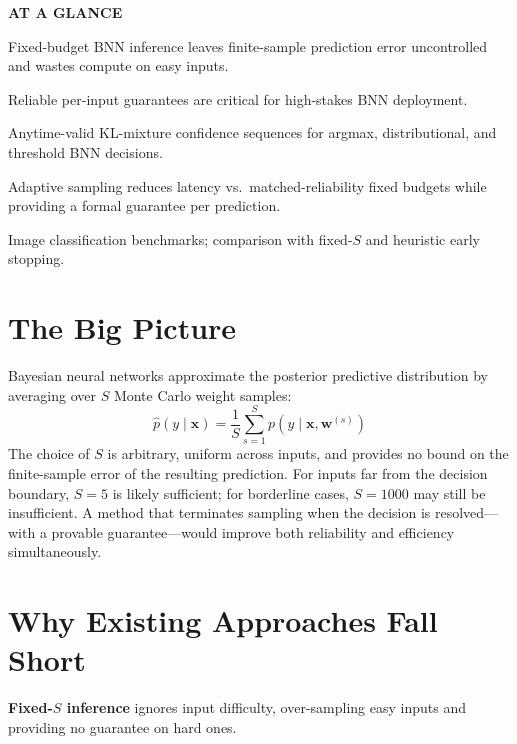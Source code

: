 \documentclass[10pt,twocolumn]{article}
\begin{document}
\begin{mdframed}[backgroundcolor=boxgray,linecolor=rulered,linewidth=1pt,
    innerleftmargin=6pt,innerrightmargin=6pt,
    innertopmargin=6pt,innerbottommargin=6pt]
\textbf{\small AT A GLANCE}\par\vspace{4pt}
\begin{description}[leftmargin=0pt,labelsep=4pt,itemsep=2pt,parsep=0pt,
    font=\small\bfseries]
  \item[Problem:] Fixed-budget BNN inference leaves finite-sample
    prediction error uncontrolled and wastes compute on easy inputs.
  \item[Why it matters:] Reliable per-input guarantees are critical
    for high-stakes BNN deployment.
  \item[Method:] Anytime-valid KL-mixture confidence sequences
    for argmax, distributional, and threshold BNN decisions.
  \item[Result:] Adaptive sampling reduces latency vs.\ matched-reliability
    fixed budgets while providing a formal guarantee per prediction.
  \item[Evidence:] Image classification benchmarks; comparison with
    fixed-$S$ and heuristic early stopping.
\end{description}
\end{mdframed}

\section{The Big Picture}

Bayesian neural networks approximate the posterior predictive distribution
by averaging over $S$ Monte Carlo weight samples:
\[
\hat{p}(y \mid \mathbf{x}) = \frac{1}{S}\sum_{s=1}^S p(y \mid \mathbf{x}, \mathbf{w}^{(s)})
\]
The choice of $S$ is arbitrary, uniform across inputs, and provides no
bound on the finite-sample error of the resulting prediction. For inputs
far from the decision boundary, $S=5$ is likely sufficient; for borderline
cases, $S=1000$ may still be insufficient. A method that terminates
sampling when the decision is resolved---with a provable guarantee---would
improve both reliability and efficiency simultaneously.

\section{Why Existing Approaches Fall Short}

\textbf{Fixed-$S$ inference} ignores input difficulty, over-sampling easy
inputs and providing no guarantee on hard ones.
\end{document}
